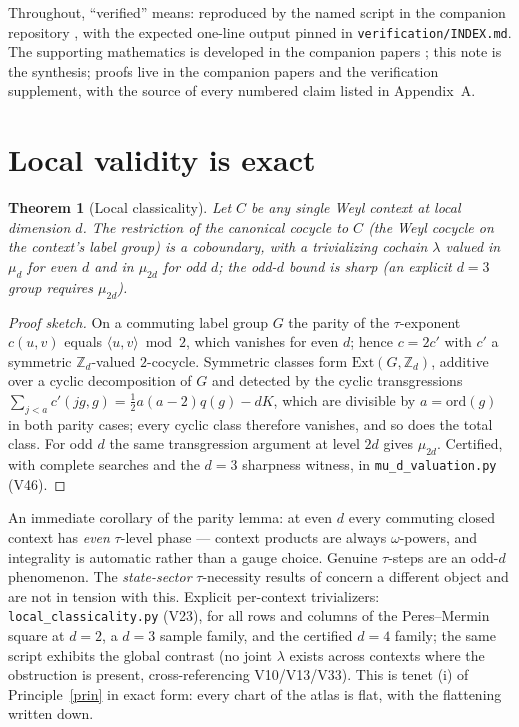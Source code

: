 \documentclass[11pt]{article}
\newtheorem{theorem}{Theorem}
\theoremstyle{definition}
\theoremstyle{remark}
\begin{document}
Throughout, ``verified'' means: reproduced by the named script in the companion
repository \cite{repo}, with the expected one-line output pinned in
\texttt{verification/INDEX.md}. The supporting mathematics is developed in the companion
papers \cite{paperA,paperB,paperC,paperD}; this note is the synthesis; proofs
live in the companion papers and the verification supplement, with the source of every
numbered claim listed in Appendix~A.

\section{Local validity is exact}\label{sec:local}
\begin{theorem}[Local classicality]\label{thm:local}
Let $C$ be any single Weyl context at local dimension $d$. The restriction of the
canonical cocycle to $C$ (the Weyl cocycle on the context's label group) is a
coboundary, with a trivializing cochain $\lambda$ valued in $\mu_d$ for \emph{even}
$d$ and in $\mu_{2d}$ for \emph{odd} $d$; the odd-$d$ bound is sharp (an explicit
$d=3$ group requires $\mu_{2d}$).
\end{theorem}
\begin{proof}[Proof sketch]
On a commuting label group $G$ the parity of the $\tau$-exponent $c(u,v)$ equals
$\langle u,v\rangle \bmod 2$, which vanishes for even $d$; hence $c=2c'$ with $c'$ a
symmetric $\mathbb Z_d$-valued $2$-cocycle. Symmetric classes form
$\mathrm{Ext}(G,\mathbb Z_d)$, additive over a cyclic decomposition of $G$ and
detected by the cyclic transgressions $\sum_{j<a} c'(jg,g)=\tfrac12 a(a-2)q(g)-dK$,
which are divisible by $a=\mathrm{ord}(g)$ in both parity cases; every cyclic class
therefore vanishes, and so does the total class. For odd $d$ the same transgression
argument at level $2d$ gives $\mu_{2d}$. Certified, with complete searches and the
$d=3$ sharpness witness, in \texttt{mu\_d\_valuation.py} (V46).
\end{proof}
An immediate corollary of the parity lemma: at even $d$ every commuting closed
context has \emph{even} $\tau$-level phase --- context products are always
$\omega$-powers, and integrality is automatic rather than a gauge choice. Genuine
$\tau$-steps are an odd-$d$ phenomenon. The \emph{state-sector} $\tau$-necessity results
of \cite{paperC} concern a different object and are not in tension with this.
Explicit per-context trivializers: \texttt{local\_classicality.py} (V23),
for all rows and columns of the Peres--Mermin square at $d=2$, a $d=3$ sample family,
and the certified $d=4$ family; the same script exhibits the global contrast (no joint
$\lambda$ exists across contexts where the obstruction is present, cross-referencing
V10/V13/V33). This is tenet (i) of Principle~\ref{prin} in exact form: every chart of
the atlas is flat, with the flattening written down.
\end{document}
